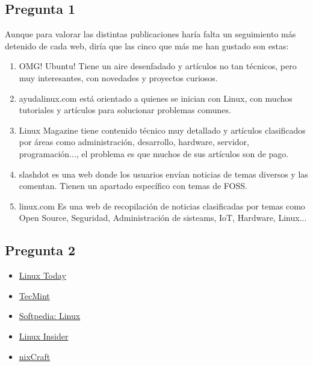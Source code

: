 \subsection{Pregunta 1}
Aunque para valorar las distintas publicaciones haría falta un seguimiento más detenido de cada web, diría que las cinco que más me han gustado son estas:
\begin{enumerate}
    \item OMG! Ubuntu! Tiene un aire desenfadado y artículos no tan técnicos, pero muy interesantes, con novedades y proyectos curiosos.
    \item ayudalinux.com está orientado a quienes se inician con Linux, con muchos tutoriales y artículos para solucionar problemas comunes.
    \item Linux Magazine tiene contenido técnico muy detallado y artículos clasificados por áreas como administración, desarrollo, hardware, servidor, programación..., el problema es que muchos de sus artículos son de pago.
    \item slashdot es una web donde los usuarios envían noticias de temas diversos y las comentan. Tienen un apartado específico con temas de FOSS.
    \item linux.com Es una web de recopilación de noticias clasificadas por temas como Open Source, Seguridad, Administración de sisteams, IoT, Hardware, Linux...
\end{enumerate}

\subsection{Pregunta 2}

\begin{itemize}
    \item \href{https://www.linuxtoday.com/}{Linux Today}
    \item \href{https://www.tecmint.com/}{TecMint}
    \item \href{https://linux.softpedia.com}{Softpedia: Linux}
    \item \href{https://linuxinsider.com/}{Linux Insider}
    \item \href{https://www.cyberciti.biz/}{nixCraft}
\end{itemize}


